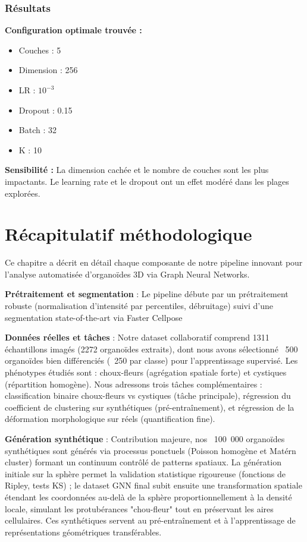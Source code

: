 \subsubsection{Résultats}

\textbf{Configuration optimale trouvée :}
\begin{itemize}
    \item Couches : 5
    \item Dimension : 256
    \item LR : $10^{-3}$
    \item Dropout : 0.15
    \item Batch : 32
    \item K : 10
\end{itemize}

\textbf{Sensibilité :}
La dimension cachée et le nombre de couches sont les plus impactants. Le learning rate et le dropout ont un effet modéré dans les plages explorées.

\section{Récapitulatif méthodologique}

Ce chapitre a décrit en détail chaque composante de notre pipeline innovant pour l'analyse automatisée d'organoïdes 3D via Graph Neural Networks.

\textbf{Prétraitement et segmentation} : Le pipeline débute par un prétraitement robuste (normalisation d'intensité par percentiles, débruitage) suivi d'une segmentation state-of-the-art via Faster Cellpose

\textbf{Données réelles et tâches} : Notre dataset collaboratif comprend 1311 échantillons imagés (2272 organoïdes extraits), dont nous avons sélectionné ~500 organoïdes bien différenciés (~250 par classe) pour l'apprentissage supervisé. Les phénotypes étudiés sont : choux-fleurs (agrégation spatiale forte) et cystiques (répartition homogène). Nous adressons trois tâches complémentaires : classification binaire choux-fleurs vs cystiques (tâche principale), régression du coefficient de clustering sur synthétiques (pré-entraînement), et régression de la déformation morphologique sur réels (quantification fine).

\textbf{Génération synthétique} : Contribution majeure, nos ~100~000 organoïdes synthétiques sont générés via processus ponctuels (Poisson homogène et Matérn cluster) formant un continuum contrôlé de patterns spatiaux. La génération initiale sur la sphère permet la validation statistique rigoureuse (fonctions de Ripley, tests KS) ; le dataset GNN final subit ensuite une transformation spatiale étendant les coordonnées au-delà de la sphère proportionnellement à la densité locale, simulant les protubérances "chou-fleur" tout en préservant les aires cellulaires. Ces synthétiques servent au pré-entraînement et à l'apprentissage de représentations géométriques transférables.

